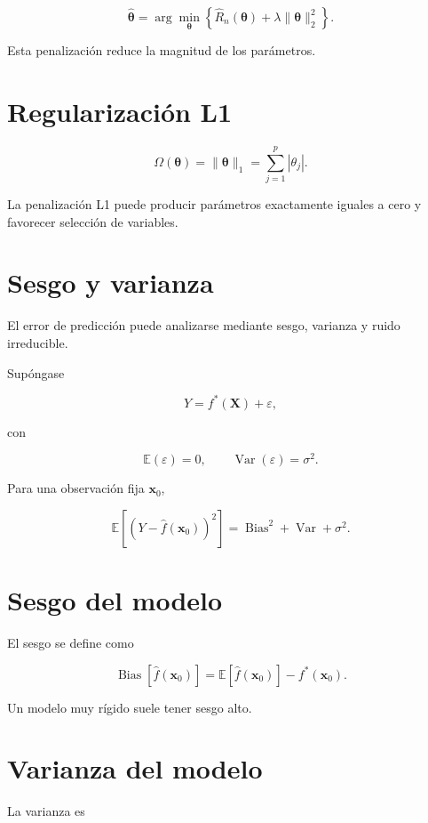 \documentclass[
  spanish,
  11pt,
  letterpaper,
  DIV=11,
  numbers=noendperiod]{scrreprt}
\theoremstyle{definition}
\theoremstyle{plain}
\theoremstyle{definition}
\theoremstyle{remark}
\begin{document}
\[
\widehat{\boldsymbol{\theta}}
=
\arg\min_{\boldsymbol{\theta}}
\left\{
\widehat{R}_n(\boldsymbol{\theta})
+
\lambda
\|\boldsymbol{\theta}\|_2^2
\right\}.
\]

Esta penalización reduce la magnitud de los parámetros.

\section{Regularización L1}\label{regularizaciuxf3n-l1}

\[
\Omega(\boldsymbol{\theta})
=
\|\boldsymbol{\theta}\|_1
=
\sum_{j=1}^{p}
|\theta_j|.
\]

La penalización L1 puede producir parámetros exactamente iguales a cero
y favorecer selección de variables.

\section{Sesgo y varianza}\label{sesgo-y-varianza}

El error de predicción puede analizarse mediante sesgo, varianza y ruido
irreducible.

Supóngase

\[
Y=f^{*}(\mathbf{X})+\varepsilon,
\]

con

\[
\mathbb{E}(\varepsilon)=0,
\qquad
\operatorname{Var}(\varepsilon)=\sigma^2.
\]

Para una observación fija \(\mathbf{x}_0\),

\[
\mathbb{E}
\left[
(
Y-\widehat{f}(\mathbf{x}_0)
)^2
\right]
=
\operatorname{Bias}^2
+
\operatorname{Var}
+
\sigma^2.
\]

\section{Sesgo del modelo}\label{sesgo-del-modelo}

El sesgo se define como

\[
\operatorname{Bias}
[
\widehat{f}(\mathbf{x}_0)
]
=
\mathbb{E}
[
\widehat{f}(\mathbf{x}_0)
]
-
f^{*}(\mathbf{x}_0).
\]

Un modelo muy rígido suele tener sesgo alto.

\section{Varianza del modelo}\label{varianza-del-modelo}

La varianza es
\end{document}
